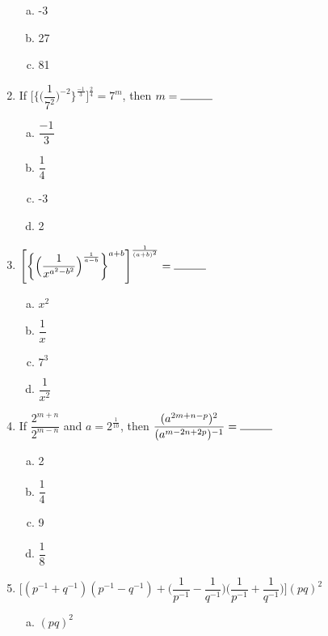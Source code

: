 \begin{multicols}{2}
\begin{enumerate}
\begin{multicols}{2}
\begin{enumerate}[(a)]
\item -3
\item 27
\item 81
\end{enumerate}
\end{multicols}
\item If $\Bigg[\bigg\{\Big(\dfrac{1}{7^2}\Big)^{-2}\bigg\}^{\frac{-1}{3}}\Bigg]^{\frac{2}{4}} = 7^m$, then $m = \rule{1cm}{0.15mm}$
\begin{multicols}{2}
\begin{enumerate}[(a)]
\item $\dfrac{-1}{3}$
\item $\dfrac{1}{4}$
\item -3
\item 2
\end{enumerate}
\end{multicols}
\item $\Bigg[\bigg\{\Big(\dfrac{1}{x^{a^2-b^2}}\Big)^{\frac{1}{a-b}}\bigg\}^{a+b}\Bigg]^{\frac{1}{(a+b)^2}} = \rule{1cm}{0.15mm}$
\begin{multicols}{2}
\begin{enumerate}[(a)]
\item $x^2$
\item $\dfrac{1}{x}$
\item $7^3$
\item $\dfrac{1}{x^2}$
\end{enumerate}
\end{multicols}
\item If $\dfrac{2^{m+n}}{2^{m-n}}$ and $a = 2^{\frac{1}{10}}$, then $\dfrac{(a^{2m+n-p})^2}{(a^{m-2n+2p})^{-1}} = \rule{1cm}{0.15mm}$
\begin{multicols}{2}
\begin{enumerate}[(a)]
\item 2
\item $\dfrac{1}{4}$
\item 9
\item $\dfrac{1}{8}$
\end{enumerate}
\end{multicols}
\item $\Bigg[(p^{-1}+q^{-1})(p^{-1}-q^{-1})+\bigg(\dfrac{1}{p^{-1}}-\dfrac{1}{q^{-1}}\bigg)\bigg(\dfrac{1}{p^{-1}}+\dfrac{1}{q^{-1}}\bigg)     \Bigg](pq)^2$
\begin{multicols}{2}
\begin{enumerate}[(a)]
\item $(pq)^2$

\end{enumerate}
\end{multicols}
\end{enumerate}
\end{multicols}
